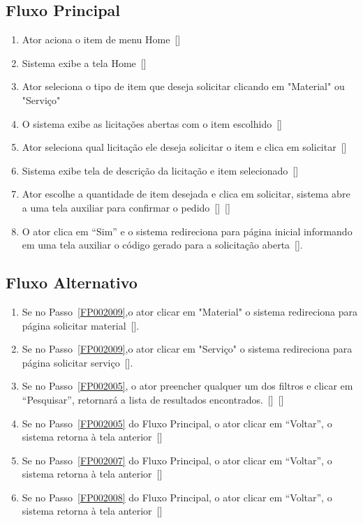 \begin{anexosenv}
\subsection*{Fluxo Principal}
\begin{enumerate}
    \item Ator aciona o item de menu Home~[]
    \item Sistema exibe a tela Home~[]
    \item\label{FP002009} Ator seleciona o tipo de item que deseja solicitar clicando em "Material" ou "Serviço"
    \item O sistema exibe as licitações abertas com o item escolhido~[]
    \item\label{FP002005} Ator seleciona qual licitação ele deseja solicitar o item e clica em solicitar~[]
    \item Sistema exibe tela de descrição da licitação e item selecionado~[]
    \item\label{FP002007} Ator escolhe a quantidade de item desejada e clica em solicitar, sistema abre a uma tela auxiliar para confirmar o pedido~[]~[]
    \item\label{FP002008} O ator clica em ``Sim'' e o sistema redireciona para página inicial informando em uma tela auxiliar o código gerado para a solicitação aberta~[].
\end{enumerate}

\subsection*{Fluxo Alternativo}
\begin{enumerate}
    \item Se no Passo~\ref{FP002009},o ator clicar em "Material" o sistema redireciona para página solicitar material~[].
    \item Se no Passo~\ref{FP002009},o ator clicar em "Serviço" o sistema redireciona para página solicitar serviço~[].
    \item Se no Passo~\ref{FP002005}, o ator preencher qualquer um dos filtros e clicar em ``Pesquisar'', retornará a lista de resultados encontrados.~[]~[]
    \item Se no Passo~\ref{FP002005} do Fluxo Principal, o ator clicar em ``Voltar'', o sistema retorna à tela anterior~[]
    \item Se no Passo~\ref{FP002007} do Fluxo Principal, o ator clicar em ``Voltar'', o sistema retorna à tela anterior~[]
    \item Se no Passo~\ref{FP002008} do Fluxo Principal, o ator clicar em ``Voltar'', o sistema retorna à tela anterior~[]
\end{enumerate}


\end{anexosenv}
